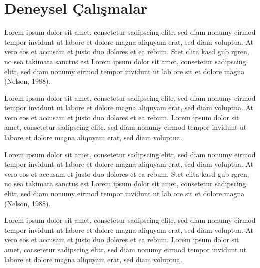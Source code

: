 \section{Deneysel Çalışmalar}
Lorem ipsum dolor sit amet, consetetur sadipscing elitr, sed diam nonumy eirmod tempor invidunt ut labore et dolore magna aliquyam erat, sed diam voluptua. At vero eos et accusam et justo duo dolores et ea rebum. Stet clita kasd gub rgren, no sea takimata sanctus est Lorem ipsum dolor sit amet, consetetur sadipscing elitr, sed diam nonumy eirmod tempor invidunt ut lab ore sit et dolore magna (Nelson, 1988).

Lorem ipsum dolor sit amet, consetetur sadipscing elitr, sed diam nonumy eirmod tempor invidunt ut labore et dolore magna aliquyam erat, sed diam voluptua. At vero eos et accusam et justo duo dolores et ea rebum. Lorem ipsum dolor sit amet, consetetur sadipscing elitr, sed diam nonumy eirmod tempor invidunt ut labore et dolore magna aliquyam erat, sed diam voluptua.

Lorem ipsum dolor sit amet, consetetur sadipscing elitr, sed diam nonumy eirmod tempor invidunt ut labore et dolore magna aliquyam erat, sed diam voluptua. At vero eos et accusam et justo duo dolores et ea rebum. Stet clita kasd gub rgren, no sea takimata sanctus est Lorem ipsum dolor sit amet, consetetur sadipscing elitr, sed diam nonumy eirmod tempor invidunt ut lab ore sit et dolore magna (Nelson, 1988).

Lorem ipsum dolor sit amet, consetetur sadipscing elitr, sed diam nonumy eirmod tempor invidunt ut labore et dolore magna aliquyam erat, sed diam voluptua. At vero eos et accusam et justo duo dolores et ea rebum. Lorem ipsum dolor sit amet, consetetur sadipscing elitr, sed diam nonumy eirmod tempor invidunt ut labore et dolore magna aliquyam erat, sed diam voluptua.

